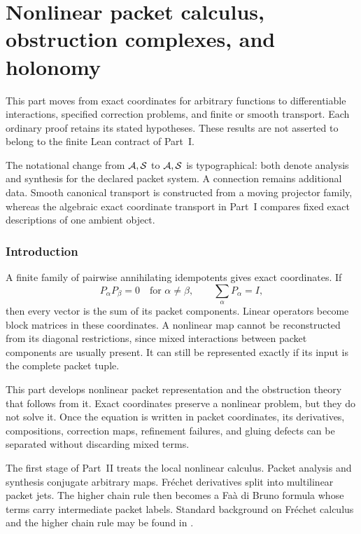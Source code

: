 \part{Nonlinear packet calculus, obstruction complexes, and holonomy}\label{part:nonlinear}
\noindent This part moves from exact coordinates for arbitrary functions to differentiable interactions, specified correction problems, and finite or smooth transport. Each ordinary proof retains its stated hypotheses. These results are not asserted to belong to the finite Lean contract of Part~I.

\medskip\noindent The notational change from \(\mathcal A,\mathcal S\) to \(\mathcal A,\mathcal S\) is typographical: both denote analysis and synthesis for the declared packet system. A connection remains additional data. Smooth canonical transport is constructed from a moving projector family, whereas the algebraic exact coordinate transport in Part~I compares fixed exact descriptions of one ambient object.
\section{Introduction}\label{sec:introduction}

A finite family of pairwise annihilating idempotents gives exact coordinates.  If
\[
P_\alpha P_\beta=0
\quad\text{for }\alpha\ne\beta,
\qquad
\sum_\alpha P_\alpha=I,
\]
then every vector is the sum of its packet components.  Linear operators become block matrices in these coordinates.  A nonlinear map cannot be reconstructed from its diagonal restrictions, since mixed interactions between packet components are usually present.  It can still be represented exactly if its input is the complete packet tuple.

This part develops nonlinear packet representation and the obstruction theory that follows from it.  Exact coordinates preserve a nonlinear problem, but they do not solve it.  Once the equation is written in packet coordinates, its derivatives, compositions, correction maps, refinement failures, and gluing defects can be separated without discarding mixed terms.

The first stage of Part~II treats the local nonlinear calculus.  Packet analysis and synthesis conjugate arbitrary maps.  Fr\'echet derivatives split into multilinear packet jets.  The higher chain rule then becomes a Fa\`a di Bruno formula whose terms carry intermediate packet labels.  Standard background on Fr\'echet calculus and the higher chain rule may be found in \cite{AbrahamMarsdenRatiu1988,ConstantineSavits1996,Deimling1985}.

